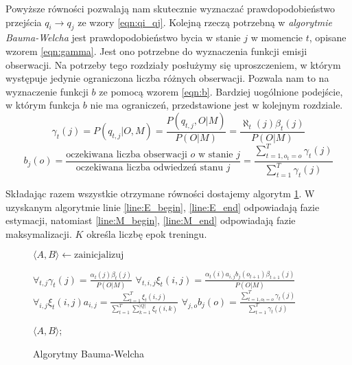\documentclass[11pt]{article}
\begin{document}
		Powyższe równości pozwalają nam skutecznie wyznaczać prawdopodobieństwo przejścia $q_i \rightarrow q_j$ ze wzory \ref{eqn:qi_qj}. Kolejną rzeczą potrzebną w \textit{algorytmie Bauma-Welcha} jest prawdopodobieństwo bycia w stanie $j$ w momencie $t$, opisane wzorem \ref{eqn:gamma}. Jest ono potrzebne do wyznaczenia funkcji emisji obserwacji. Na potrzeby tego rozdziały posłużymy się uproszczeniem, w którym występuje jedynie ograniczona liczba różnych obserwacji. Pozwala nam to na wyznaczenie funkcji $b$ ze pomocą wzorem \ref{eqn:b}. Bardziej uogólnione podejście, w którym funkcja $b$ nie ma ograniczeń, przedstawione jest w kolejnym rozdziale.
		\begin{equation}
			\gamma_t(j) = P(q_{t,j}|O,M) = \frac{P(q_{t,j},O|M)}{P(O|M)} = \frac{\aleph_t(j)\beta_t(j)}{P(O|M)}
			\label{eqn:gamma}
		\end{equation}
		\begin{equation}
			b_j(o)=\frac{\text{oczekiwana liczba obserwacji $o$ w stanie $j$}}{\text{oczekiwana liczba odwiedzeń stanu $j$}} = \frac{\sum_{t=1,o_t=o}^T\gamma_t(j)}{\sum_{t=1}^T\gamma_t(j)}
			\label{eqn:b}
		\end{equation}
		
		Składając razem wszystkie otrzymane równości dostajemy algorytm \ref{alg:Baum_Welch}. W uzyskanym algorytmie linie \ref{line:E_begin}, \ref{line:E_end} odpowiadają fazie estymacji, natomiast \ref{line:M_begin}, \ref{line:M_end} odpowiadają fazie maksymalizacji. $K$ określa liczbę epok treningu.
		
		\begin{figure}
			\begin{algorithmic}[1]				
				\STATE $\langle A, B\rangle \leftarrow \text{zainicjalizuj}$
				
					\STATE $\forall_{t,j} \gamma_t(j) = \frac{\alpha_t(j)\beta_t(j)}{P(O|M)} \label{line:E_begin}$
					\STATE $\forall_{t,i,j} \xi_t(i,j) = \frac{\alpha_t(i)a_{i,j}b_j(o_{t+1})\beta_{t+1}(j)}{P(O|M)} \label{line:E_end}$
					\STATE
					\STATE $\forall_{i,j} \xi_t(i,j) a_{i,j} = \frac{\sum_{t=1}^T 	\xi_t(i,j)}{\sum_{t=1}^T \sum_{k=1}^{|Q|}	\xi_t(i,k)} \label{line:M_begin}$
					\STATE $\forall_{j,o} 	b_j(o) = \frac{\sum_{t=1,o_t=o}^T\gamma_t(j)}{\sum_{t=1}^T\gamma_t(j)} \label{line:M_end}$
				\ENDFOR							
				
				\RETURN $\langle A, B\rangle$;
			\end{algorithmic}
	
			\caption{Algorytmy Bauma-Welcha}
			\label{alg:Baum_Welch}
		\end{figure}	
		
\end{document}
